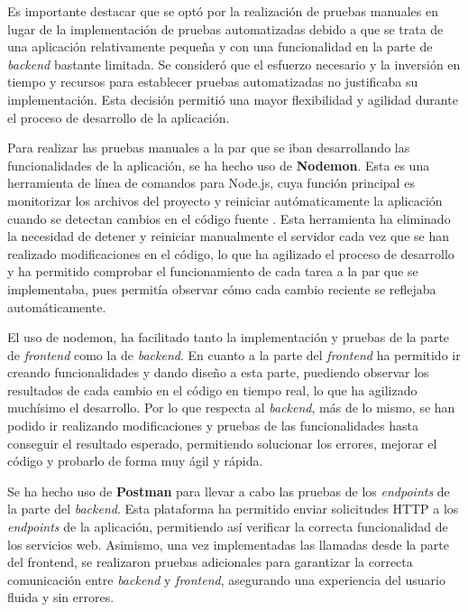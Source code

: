 \documentclass[11pt]{article}
\begin{document}
Es importante destacar que se optó por la realización de pruebas manuales en lugar de la implementación de pruebas automatizadas debido a que se 
trata de una aplicación relativamente pequeña y con una funcionalidad en la parte de \textit{backend} bastante limitada. Se consideró que el esfuerzo necesario y la inversión
en tiempo y recursos para establecer pruebas automatizadas no justificaba su implementación. Esta decisión permitió una mayor flexibilidad y agilidad durante
el proceso de desarrollo de la aplicación.

Para realizar las pruebas manuales a la par que se iban desarrollando las funcionalidades de la aplicación, se ha hecho uso de \textbf{Nodemon}. 
Esta es una herramienta de línea de comandos para Node.js, cuya función principal es monitorizar los archivos del proyecto y reiniciar autómaticamente
la aplicación cuando se detectan cambios en el código fuente \cite{nodemon}. 
Esta herramienta ha eliminado la necesidad de detener y reiniciar manualmente el servidor cada vez que se han realizado modificaciones en el código, 
lo que ha agilizado el proceso de desarrollo y ha permitido comprobar el funcionamiento de cada tarea a la par que se implementaba, pues permitía observar cómo
cada cambio reciente se reflejaba automáticamente.

El uso de nodemon, ha facilitado tanto la implementación y pruebas de la parte de \textit{frontend} como la de \textit{backend}. En cuanto a la parte del \textit{frontend}
ha permitido ir creando funcionalidades y dando diseño a esta parte, puediendo observar los resultados de cada cambio en el código en tiempo real,
lo que ha agilizado muchísimo el desarrollo. Por lo que respecta al \textit{backend}, más de lo mismo, se han podido ir realizando modificaciones y pruebas de las funcionalidades
hasta conseguir el resultado esperado, permitiendo solucionar los errores, mejorar el código y probarlo de forma muy ágil y rápida. 

Se ha hecho uso de \textbf{Postman} para llevar a cabo las pruebas de los \textit{endpoints} de la parte del \textit{backend}. Esta plataforma ha permitido enviar 
solicitudes HTTP a los \textit{endpoints} de la aplicación, permitiendo así verificar la correcta funcionalidad de los servicios web. Asimismo, una vez implementadas
las llamadas desde la parte del frontend, se realizaron pruebas adicionales para garantizar la correcta comunicación entre \textit{backend} y \textit{frontend}, asegurando una
experiencia del usuario fluida y sin errores.
\end{document}
